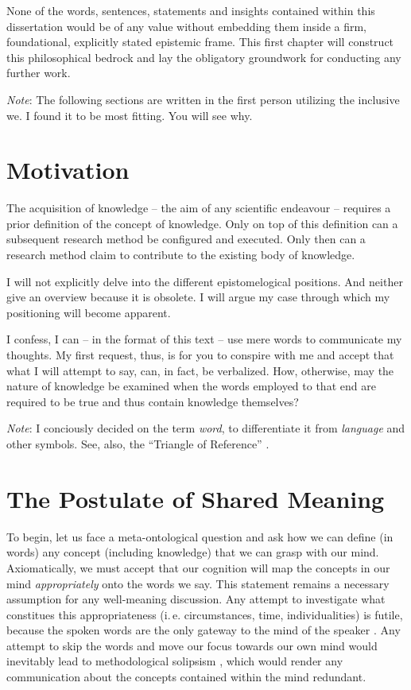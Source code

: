 None of the words, sentences, statements and insights contained within this dissertation would be of any value without embedding them inside a firm, foundational, explicitly stated epistemic frame.
This first chapter will construct this philosophical bedrock and lay the obligatory groundwork for conducting any further work.

\textit{Note}: The following sections are written in the first person utilizing the inclusive we.
I found it to be most fitting.
You will see why.


\section{Motivation}

The acquisition of knowledge -- the aim of any scientific endeavour -- requires a prior definition of the concept of knowledge.
Only on top of this definition can a subsequent research method be configured and executed.
Only then can a research method claim to contribute to the existing body of knowledge.

I will not explicitly delve into the different epistomelogical positions.
And neither give an overview because it is obsolete.
I will argue my case through which my positioning will become apparent.

I confess, I can -- in the format of this text -- use mere words to communicate my thoughts.
My first request, thus, is for you to conspire with me and accept that what I will attempt to say, can, in fact, be verbalized.
How, otherwise, may the nature of knowledge be examined when the words employed to that end are required to be true and thus contain knowledge themselves?

\textit{Note}: I conciously decided on the term \textit{word}, to differentiate it from \textit{language} and other symbols.
See, also, the \enquote{Triangle of Reference} \parencite{ogden-23}.


\section{The Postulate of Shared Meaning}

To begin, let us face a meta-ontological question and ask how we can define (in words) any concept (including knowledge) that we can grasp with our mind.
Axiomatically, we must accept that our cognition will map the concepts in our mind \textit{appropriately} onto the words we say.
This statement remains a necessary assumption for any well-meaning discussion.
Any attempt to investigate what constitues this appropriateness (i.\,e. circumstances, time, individualities) is futile, because the spoken words are the only gateway to the mind of the speaker \parencite{wittgenstein-53}.
Any attempt to skip the words and move our focus towards our own mind would inevitably lead to methodological solipsism \parencite[136]{putnam-75}, which would render any communication about the concepts contained within the mind redundant.

